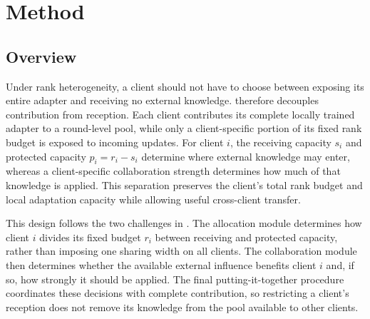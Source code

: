 \section{Method}
\label{sec:method}






\subsection{Overview}
\label{sec:method:overview}

Under rank heterogeneity, a client should not have to choose between exposing its
entire adapter and receiving no external knowledge.
\sysname therefore decouples contribution from reception.
Each client contributes its complete locally trained adapter to a round-level pool,
while only a client-specific portion of its fixed rank budget is exposed to
incoming updates.
For client $i$, the receiving capacity $s_i$ and protected capacity $p_i=r_i-s_i$
determine where external knowledge may enter, whereas a client-specific
collaboration strength determines how much of that knowledge is applied.
This separation preserves the client's total rank budget and local adaptation
capacity while allowing useful cross-client transfer.

This design follows the two challenges in .
The allocation module determines how client $i$ divides its fixed budget $r_i$
between receiving and protected capacity, rather than imposing one sharing width
on all clients.
The collaboration module then determines whether the available external influence
benefits client $i$ and, if so, how strongly it should be applied.
The final putting-it-together procedure coordinates these decisions with complete
contribution, so restricting a client's reception does not remove its knowledge
from the pool available to other clients.


